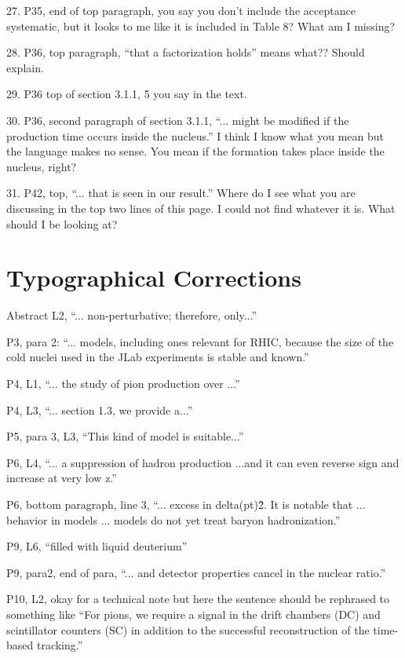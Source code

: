 \documentclass[12pt]{article}
\begin{document}
27.
P35, end of top paragraph, you say you don’t include the acceptance systematic, but it looks 
to me like it is included in Table 8?  What am I missing?



28.
P36, top paragraph, “that a factorization holds” means what??  Should explain.  



29.
P36 top of section 3.1.1, 5%
you say in the text.



30.
P36, second paragraph of section 3.1.1, “... might be modified if the production time occurs 
inside the nucleus.”  I think I know what you mean but the language makes no sense.  You 
mean if the formation takes place inside the nucleus, right?



31.
P42, top, “... that is seen in our result.”  Where do I see what you are discussing in the top 
two lines of this page.  I could not find whatever it is.  What should I be looking at?

\section{Typographical Corrections}

Abstract L2, “... non-perturbative; therefore, only...”

P3, para 2:  “... models, including ones relevant for RHIC, because the size of the cold nuclei 
used in the JLab experiments is stable and known.”

P4, L1, “... the study of pion production over ...”

P4, L3, “... section 1.3, we provide a...”

P5, para 3, L3, “This kind of model is suitable...”

P6, L4, “... a suppression of hadron production ...and it can even reverse sign and increase at 
very low z.”

P6, bottom paragraph, line 3, “... excess in delta(pt)\^2.  It is notable that ... behavior in models 
... models do not yet treat baryon hadronization.”

P9, L6, “filled with liquid deuterium”

P9, para2, end of para, “... and detector properties cancel in the nuclear ratio.”

P10, L2, okay for a technical note but here the sentence should be rephrased to something like 
“For pions, we require a signal in the drift chambers (DC) and scintillator counters (SC) in 
addition to the successful reconstruction of the time-based tracking.”
\end{document}
